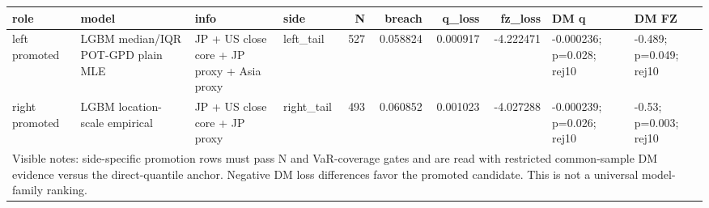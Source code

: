 \begin{tabular}{lll lrrrrll}
\toprule
role & model & info & side & N & breach & q_loss & fz_loss & DM q & DM FZ \\
\midrule
left promoted & LGBM median/IQR POT-GPD plain MLE & JP + US close core + JP proxy + Asia proxy & left\_tail & 527 & 0.058824 & 0.000917 & -4.222471 & -0.000236; p=0.028; rej10 & -0.489; p=0.049; rej10 \\
right promoted & LGBM location-scale empirical & JP + US close core + JP proxy & right\_tail & 493 & 0.060852 & 0.001023 & -4.027288 & -0.000239; p=0.026; rej10 & -0.53; p=0.003; rej10 \\
\midrule
\multicolumn{10}{l}{\footnotesize Visible notes: side-specific promotion rows must pass N and VaR-coverage gates and are read with restricted common-sample DM evidence versus the direct-quantile anchor. Negative DM loss differences favor the promoted candidate. This is not a universal model-family ranking.} \\
\bottomrule
\end{tabular}
